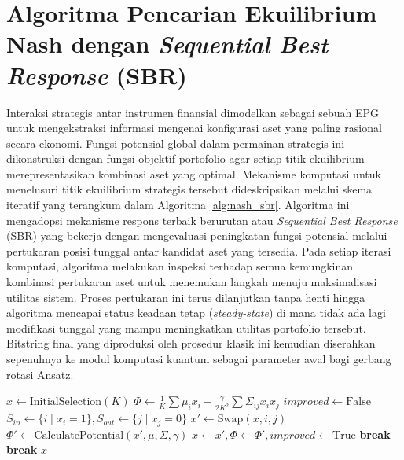 \section{Algoritma Pencarian Ekuilibrium Nash dengan \textit{Sequential Best Response} (SBR)}
Interaksi strategis antar instrumen finansial dimodelkan sebagai sebuah EPG untuk mengekstraksi informasi mengenai konfigurasi aset yang paling rasional secara ekonomi. Fungsi potensial global dalam permainan strategis ini dikonstruksi dengan fungsi objektif portofolio agar setiap titik ekuilibrium merepresentasikan kombinasi aset yang optimal. Mekanisme komputasi untuk menelusuri titik ekuilibrium strategis tersebut dideskripsikan melalui skema iteratif yang terangkum dalam Algoritma \ref{alg:nash_sbr}. Algoritma ini mengadopsi mekanisme respons terbaik berurutan atau \textit{Sequential Best Response} (SBR) yang bekerja dengan mengevaluasi peningkatan fungsi potensial melalui pertukaran posisi tunggal antar kandidat aset yang tersedia. Pada setiap iterasi komputasi, algoritma melakukan inspeksi terhadap semua kemungkinan kombinasi pertukaran aset untuk menemukan langkah menuju maksimalisasi utilitas sistem. Proses pertukaran ini terus dilanjutkan tanpa henti hingga algoritma mencapai status keadaan tetap (\textit{steady-state}) di mana tidak ada lagi modifikasi tunggal yang mampu meningkatkan utilitas portofolio tersebut. Bitstring final yang diproduksi oleh prosedur klasik ini kemudian diserahkan sepenuhnya ke modul komputasi kuantum sebagai parameter awal bagi gerbang rotasi Ansatz.

\begin{algorithm}[ht]
\caption{Pencarian Nash Equilibrium menggunakan Sequential Best Response (SBR)}
\label{alg:nash_sbr}
\begin{algorithmic}[1]
    \State $x \gets \text{InitialSelection}(K)$ 
    \State $\Phi \gets \frac{1}{K} \sum \mu_i x_i - \frac{\gamma}{2K^2} \sum \Sigma_{ij} x_i x_j$ 
        \State $improved \gets \text{False}$
        \State $S_{in} \gets \{i \mid x_i = 1\}, S_{out} \gets \{j \mid x_j = 0\}$
            \State $x' \gets \text{Swap}(x, i, j)$
            \State $\Phi' \gets \text{CalculatePotential}(x', \mu, \Sigma, \gamma)$
                \State $x \gets x', \Phi \gets \Phi', improved \gets \text{True}$
                \State \textbf{break} 
            \EndIf
        \EndFor
         \textbf{break} \EndIf
    \EndFor
    \State \Return $x$ 
\EndProcedure
\end{algorithmic}
\end{algorithm}
